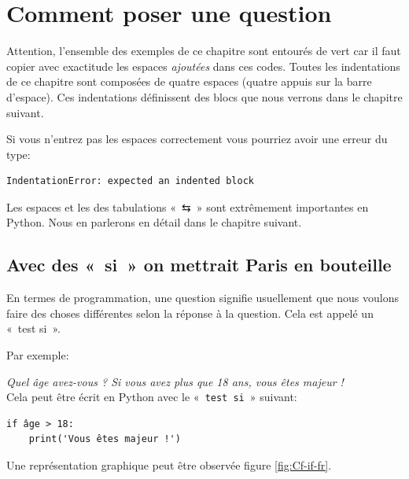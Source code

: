 


\chapter{Comment poser une question\label{chap:question}}

Attention, l'ensemble des exemples de ce chapitre sont entourés de vert car il faut copier avec exactitude les espaces \emph{ajoutées} dans ces codes. Toutes les indentations de ce chapitre sont composées de quatre espaces (quatre appuis sur la barre d'espace). Ces indentations définissent des blocs que nous verrons dans le chapitre suivant.

Si vous n'entrez pas les espaces correctement vous pourriez avoir une erreur du type:

\begin{Verbatim}[frame=single,rulecolor=\color{red}, label=erreur]
IndentationError: expected an indented block
\end{Verbatim}

\setsansfont[Mapping=tex-text]{DejaVu Sans}
Les espaces et les des tabulations « \textsf{⇆} » sont extrêmement importantes en Python. Nous en parlerons en détail dans le chapitre suivant.

\section{Avec des « si » on mettrait Paris en bouteille}
En termes de programmation, une question signifie usuellement que nous voulons faire des choses différentes selon 
la réponse à la question. Cela est appelé un « test si ».

Par exemple:

\emph{Quel âge avez-vous ? Si vous avez plus que 18 ans, vous êtes majeur !}\\


Cela peut être écrit en Python avec le « \texttt{test si} » suivant:
\begin{Verbatim}[frame=single,rulecolor=\color{gray}, label=ne pas saisir]
if âge > 18:
    print('Vous êtes majeur !')
\end{Verbatim}

Une représentation graphique peut être observée figure \ref{fig:Cf-if-fr}.


